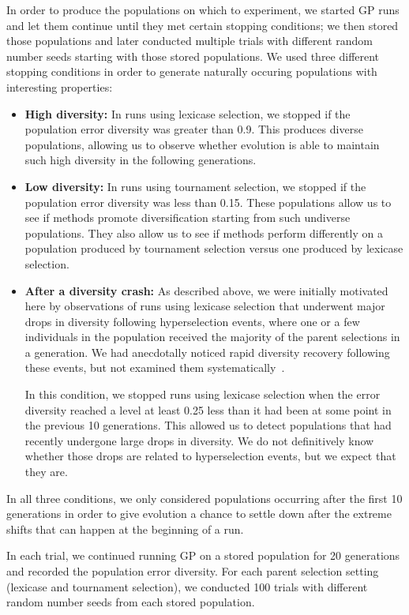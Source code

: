 \documentclass{sig-alternate-05-2015}
\begin{document}
In order to produce the populations on which to experiment, we started GP runs and let them continue until they met certain stopping conditions; we then stored those populations and later conducted multiple trials with different random number seeds starting with those stored populations. We used three different stopping conditions in order to generate naturally occuring populations with interesting properties:
\begin{itemize}
\item {\bf High diversity:}
In runs using lexicase selection, we stopped if the population error diversity was greater than 0.9. This produces  diverse populations, allowing us to observe whether evolution is able to maintain such high diversity in the following generations.

\item {\bf Low diversity:}
In runs using tournament selection, we stopped if the population error diversity was less than 0.15. These populations allow us to see if methods promote diversification starting from such undiverse populations. They also allow us to see if methods perform differently on a population produced by tournament selection versus one produced by lexicase selection.

\item {\bf After a diversity crash:}
As described above, we were initially motivated here by observations of runs using lexicase selection that underwent major drops in diversity following hyperselection events, where one or a few individuals in the population received the majority of the parent selections in a generation. We had anecdotally noticed rapid diversity recovery following these events, but not examined them systematically~\cite{Helmuth:2016:GECCO}.

In this condition, we stopped runs using lexicase selection when the error diversity reached a level at least 0.25 less than it had been at some point in the previous 10 generations. This allowed us to detect populations that had recently undergone large drops in diversity. We do not definitively know whether those drops are related to hyperselection events, but we expect that they are.

\end{itemize}
In all three conditions, we only considered populations occurring after the first 10 generations in order to give evolution a chance to settle down after the extreme shifts that can happen at the beginning of a run.

In each trial, we continued running GP on a stored population for 20 generations and recorded the population error diversity. For each parent selection setting (lexicase and tournament selection), we conducted 100 trials with different random number seeds from each stored population.
\end{document}
